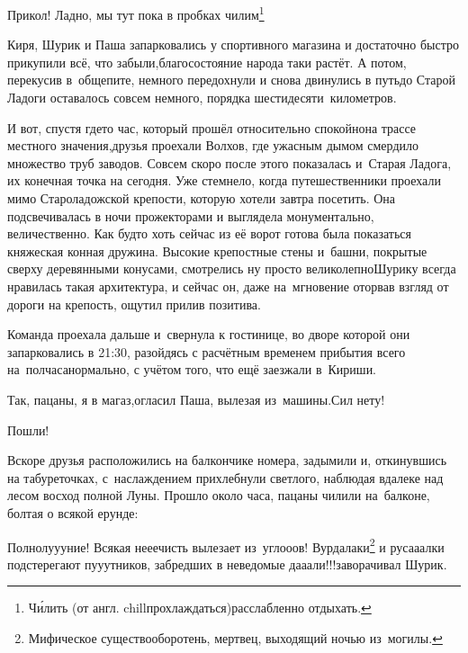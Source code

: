 \renewcommand*{\thefootnote}{\fnsymbol{footnote}}
\setcounter{footnote}{0}
\diagdash Прикол! Ладно, мы тут пока в пробках чилим\footnote{Ч\'{и}лить (от англ. chill\mdash прохлаждаться)\mdash расслабленно отдыхать.}\myldots{}

Киря, Шурик и Паша запарковались у спортивного магазина и достаточно быстро прикупили всё, что забыли,\mdash благосостояние народа таки растёт. А потом, перекусив в~общепите, немного передохнули и снова двинулись в путь\mdash до Старой Ладоги оставалось совсем немного, порядка шестидесяти~километров.

И вот, спустя где\sdash то час, который прошёл относительно спокойно\mdash на трассе местного значения,\mdash друзья проехали Волхов, где ужасным дымом смердило множество труб заводов. Совсем скоро после этого показалась и~Старая Ладога, их конечная точка на сегодня. Уже стемнело, когда путешественники проехали мимо Староладожской крепости, которую хотели завтра посетить. Она подсвечивалась в ночи прожекторами и выглядела монументально, величественно. Как будто хоть сейчас из её ворот готова была показаться княжеская конная дружина. Высокие крепостные стены и~башни, покрытые сверху деревянными конусами, смотрелись ну просто великолепно\mdash Шурику всегда нравилась такая архитектура, и сейчас он, даже на~мгновение оторвав взгляд от дороги на крепость, ощутил прилив позитива. 

Команда проехала дальше и~свернула к гостинице, во дворе которой они запарковались в 21:30, разойдясь с расчётным временем прибытия всего на~полчаса\mdash нормально, с учётом того, что ещё заезжали в~Кириши.

\diagdash Так, пацаны, я в магаз,\mdash огласил Паша, вылезая из~машины.\mdash Сил нету!

\diagdash Пошли!

Вскоре друзья расположились на балкончике номера, задымили и, откинувшись на табуреточках, с~наслаждением прихлебнули светлого, наблюдая вдалеке над лесом восход полной Луны. Прошло около часа, пацаны чилили на~балконе, болтая о всякой ерунде:

\renewcommand*{\thefootnote}{\fnsymbol{footnote}}
\setcounter{footnote}{0}

\diagdash Полнолу\sdash у\sdash уние! Всякая не\sdash е\sdash ечисть вылезает из~угло\sdash о\sdash ов! Вурдалаки\footnote{Мифическое существо\mdash оборотень, мертвец, выходящий ночью из~могилы.} и руса\sdash а\sdash алки подстерегают пу\sdash у\sdash утников, забредших в неведомые да\sdash а\sdash али!!!\mdash заворачивал Шурик.

